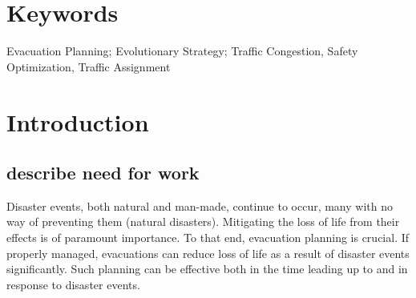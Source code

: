\documentclass{sig-alternate-05-2015}
\begin{document}

	\maketitle
	
	\begin{abstract}
		 We propose a unique evolutionary approach to the problem of evacuating urban areas in preparation or response to disaster events. Our model is unique in design and works for dynamic topologies, different disaster events, and handles roadway congestion. We apply an evolutionary strategy which optimizes traffic flow using static probabilities as traffic distributions - allowing traffic to be directed in a manner which optimizes roadway throughput and human safety, while allowing for route deviation when vehicles do not follow directions. We use a microscopic traffic model that is unconcerned with individual vehicles or routes. Our model is tested using challenging test cases as well as real-world data. Our results are then provided for comparison.
	\end{abstract}
	\section*{Keywords}
	Evacuation Planning; Evolutionary Strategy; Traffic Congestion, Safety Optimization, Traffic Assignment
	\section{Introduction}
	\subsection{describe need for work}
	Disaster events, both natural and man-made, continue to occur, many with no way of preventing them (natural disasters). Mitigating the loss of life from their effects is of paramount importance. To that end, evacuation planning is crucial. If properly managed, evacuations can reduce loss of life as a result of disaster events significantly. Such planning can be effective both in the time leading up to and in response to disaster events. 
	
\end{document}
